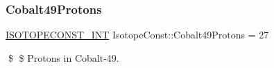 \subsubsection{\texorpdfstring{Cobalt49\+Protons}{Cobalt49Protons}}
{\footnotesize\ttfamily \mbox{\hyperlink{group___isotope_const-_macros_ga5f18360b3e99483a35c32d789e62621c}{I\+S\+O\+T\+O\+P\+E\+C\+O\+N\+S\+T\+\_\+\+I\+NT}} Isotope\+Const\+::\+Cobalt49\+Protons = 27}

\$ \$ Protons in Cobalt-\/49. 